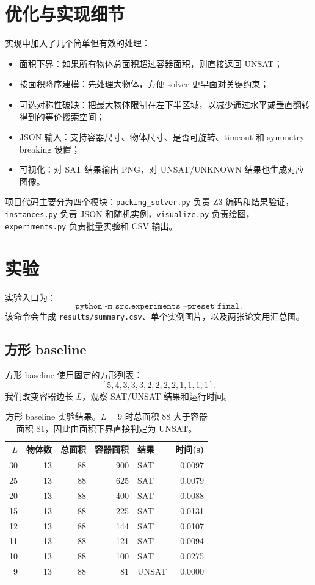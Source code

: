 \documentclass[UTF8,11pt]{ctexart}
\begin{document}
\section{优化与实现细节}

实现中加入了几个简单但有效的处理：
\begin{itemize}
    \item 面积下界：如果所有物体总面积超过容器面积，则直接返回 UNSAT；
    \item 按面积降序建模：先处理大物体，方便 solver 更早面对关键约束；
    \item 可选对称性破缺：把最大物体限制在左下半区域，以减少通过水平或垂直翻转得到的等价搜索空间；
    \item JSON 输入：支持容器尺寸、物体尺寸、是否可旋转、timeout 和 symmetry breaking 设置；
    \item 可视化：对 SAT 结果输出 PNG，对 UNSAT/UNKNOWN 结果也生成对应图像。
\end{itemize}

项目代码主要分为四个模块：\texttt{packing\_solver.py} 负责 Z3 编码和结果验证，\texttt{instances.py} 负责 JSON 和随机实例，\texttt{visualize.py} 负责绘图，\texttt{experiments.py} 负责批量实验和 CSV 输出。

\section{实验}

实验入口为：
\[
\texttt{python -m src.experiments --preset final}.
\]
该命令会生成 \texttt{results/summary.csv}、单个实例图片，以及两张论文用汇总图。

\subsection{方形 baseline}

方形 baseline 使用固定的方形列表：
\[
[5,4,3,3,3,2,2,2,2,1,1,1,1].
\]
我们改变容器边长 \(L\)，观察 SAT/UNSAT 结果和运行时间。

\begin{table}[H]
\centering
\begin{tabular}{rrrrlr}
\toprule
\(L\) & 物体数 & 总面积 & 容器面积 & 结果 & 时间(s) \\
\midrule
30 & 13 & 88 & 900 & SAT & 0.0097 \\
25 & 13 & 88 & 625 & SAT & 0.0079 \\
20 & 13 & 88 & 400 & SAT & 0.0088 \\
15 & 13 & 88 & 225 & SAT & 0.0131 \\
12 & 13 & 88 & 144 & SAT & 0.0107 \\
11 & 13 & 88 & 121 & SAT & 0.0094 \\
10 & 13 & 88 & 100 & SAT & 0.0275 \\
9  & 13 & 88 & 81  & UNSAT & 0.0000 \\
\bottomrule
\end{tabular}
\caption{方形 baseline 实验结果。\(L=9\) 时总面积 88 大于容器面积 81，因此由面积下界直接判定为 UNSAT。}
\end{table}
\end{document}
